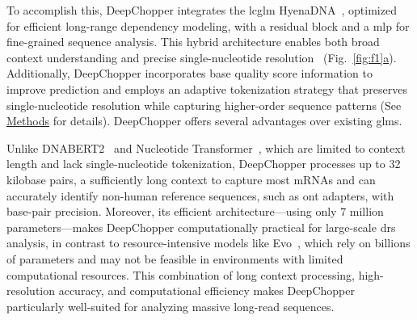 \documentclass[pdflatex,sn-nature, lineno]{sn-jnl}%
\newcommand{\figref}[2]{Fig.~\hyperref[#1]{\ref*{#1}#2}}
\begin{document}
To accomplish this, DeepChopper integrates the \gls{lcglm} HyenaDNA~\cite{nguyen2024hyenadna}, optimized for efficient long-range dependency modeling, with a residual block and a \gls{mlp} for fine-grained sequence analysis.
This hybrid architecture enables both broad context understanding and precise single-nucleotide resolution~\cite{poli2023hyena, he2015deep} (\figref{fig:f1}{a}).
Additionally, DeepChopper incorporates base quality score information to improve prediction and employs an adaptive tokenization strategy that preserves single-nucleotide resolution while capturing higher-order sequence patterns (See \hyperref[sec:methods]{Methods} for details).
DeepChopper offers several advantages over existing \glspl{glm}.

Unlike DNABERT2~\cite{zhou2023dnabert2} and Nucleotide Transformer~\cite{dalla2023nucleotide}, which are limited to context length and lack single-nucleotide tokenization, DeepChopper processes up to 32 kilobase pairs, a sufficiently long context to capture most mRNAs and can accurately identify non-human reference sequences, such as \gls{ont} adapters, with base-pair precision.
Moreover, its efficient architecture—using only 7 million parameters—makes DeepChopper computationally practical for large-scale \gls{drs} analysis, in contrast to resource-intensive models like Evo~\cite{nguyen2024sequence}, which rely on billions of parameters and may not be feasible in environments with limited computational resources.
This combination of long context processing, high-resolution accuracy, and computational efficiency makes DeepChopper particularly well-suited for analyzing massive long-read sequences.
\end{document}
